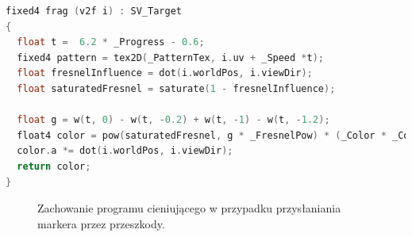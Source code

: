 \begin{lstlisting}[language=C++, caption=Fragment shadera odpowiedzialny za animację.]
fixed4 frag (v2f i) : SV_Target
{
  float t =  6.2 * _Progress - 0.6;
  fixed4 pattern = tex2D(_PatternTex, i.uv + _Speed *t);
  float fresnelInfluence = dot(i.worldPos, i.viewDir);
  float saturatedFresnel = saturate(1 - fresnelInfluence);

  float g = w(t, 0) - w(t, -0.2) + w(t, -1) - w(t, -1.2);
  float4 color = pow(saturatedFresnel, g * _FresnelPow) * (_Color * _ColorIntensity) * pattern;
  color.a *= dot(i.worldPos, i.viewDir);
  return color;
}
\end{lstlisting}

 \begin{figure}[htbp]
    \centering
    \qquad
    \caption{Zachowanie programu cieniującego w przypadku przysłaniania markera przez przeszkody.}
\end{figure}
\FloatBarrier
